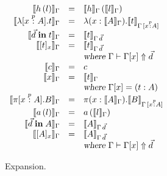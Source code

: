 \begin{figure}
\begin{center}
\begin{math}
\begin{array}{rclr}

\llbracket h\,(l) \rrbracket_{\Gamma}
&=& 
\llbracket h \rrbracket_{\Gamma}\,(\llbracket l \rrbracket_{\Gamma}) 
\\
\llbracket \lambda [x \stackrel{p}{:} A]. t \rrbracket_{\Gamma}
&=&
\lambda (x : \llbracket A \rrbracket_{\Gamma}). \llbracket t \rrbracket_{\Gamma \, [x \stackrel{p}{:} A]}
\\
\llbracket \vec{d} \;\textbf{in}\; t \rrbracket_{\Gamma}
&=&
\llbracket t \rrbracket_{\Gamma \, \vec{d}}
\\
\llbracket [ t ]_{x} \rrbracket_{\Gamma}
&=&
\llbracket t \rrbracket_{\Gamma \, \vec{d}} \\
&&\textsl{where } \Gamma \vdash \Gamma[x] \Uparrow \vec{d}
\\
\llbracket c \rrbracket_{\Gamma} 
&=&
c
\\
\llbracket x \rrbracket_{\Gamma} 
&=&
\llbracket t \rrbracket_{\Gamma} \\
&& \textsl{where } \Gamma[x] = (t : A)
\\
\llbracket \pi [x \stackrel{p}{:} A]. B \rrbracket_{\Gamma}
&=&
\pi (x : \llbracket A \rrbracket_{\Gamma}). \llbracket B \rrbracket_{\Gamma \, [x \stackrel{p}{:} A]}
\\
\llbracket a\,(l) \rrbracket_{\Gamma}
&=&
a\,(\llbracket l \rrbracket_{\Gamma}) 
\\
\llbracket \vec{d} \;\textbf{in}\; A \rrbracket_{\Gamma}
&=&
\llbracket A \rrbracket_{\Gamma \, \vec{d}}
\\
\llbracket [ A ]_{x} \rrbracket_{\Gamma}
&=&
\llbracket A \rrbracket_{\Gamma \, \vec{d}}\\
&&\textsl{where } \Gamma \vdash \Gamma[x] \Uparrow \vec{d}
\\
\end{array}
\end{math}
\end{center}
\caption{Expansion.}
\label{fig:expansion}
\end{figure}
